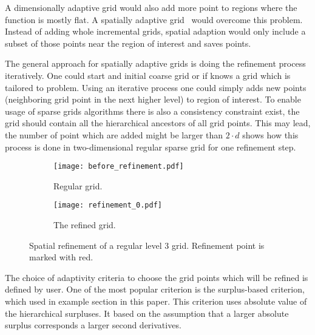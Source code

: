 A dimensionally adaptive grid would also add more point to regions where the function is mostly flat.
A spatially adaptive grid~\cite{pflueger10spatially} would overcome this problem. Instead of adding whole incremental grids,
spatial adaption would only include a subset of those points near the region of interest and saves points.

The general approach for spatially adaptive grids is doing the refinement process iteratively.
One could start and initial coarse grid or if knows a grid which is tailored to problem. Using an iterative process
one could simply adds new points (neighboring grid point in the next higher level) to region of interest. To enable usage
of sparse grids algorithms there is also a consistency constraint exist, the grid should contain all the hierarchical
ancestors of all grid points. This may lead, the number of point which are added might be larger than \( 2 \cdot d \)  shows how this process is done in two-dimensional regular sparse grid for one refinement step.

\begin{figure}[hbtp]
    \centering
    \begin{subfigure}{0.22\textwidth}
        \texttt{[image: before\_refinement.pdf]}
        \caption{Regular grid.}
        \label{fig:regularlevel3}
    \end{subfigure}%
    \begin{subfigure}{0.22\textwidth}
        \texttt{[image: refinement\_0.pdf]}
        \caption{The refined grid.}
    \end{subfigure}
    \caption{Spatial refinement of a regular level 3 grid. Refinement point is marked with red.}
    \label{fig:spatialrefiment}
\end{figure}

The choice of adaptivity criteria to choose the grid points which
will be refined is defined by user. One of the most popular criterion is the surplus-based criterion,
which used in example section in this paper. This criterion uses absolute value of the hierarchical surpluses.
It based on the assumption that a larger absolute surplus corresponds a larger second derivatives.